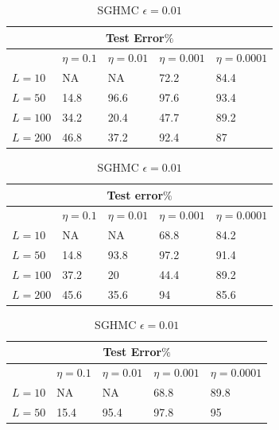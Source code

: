 \documentclass[12pt]{report}
\begin{document}
\begin{table}[]
\begin{minipage}{0.5\linewidth}
\centering
\footnotesize
\begin{tabular}{@{}lllll@{}}
\toprule
\multicolumn{5}{c}{Test Error$\%$}                  \\ \midrule
     & $\eta = 0.1$ & $\eta = 0.01$ & $\eta = 0.001$ & $\eta =0.0001$ \\ \midrule
     
$L=10$  & NA       & NA     & 72.2      & 84.4    \\ \midrule
$L=50 $ & 14.8       & 96.6     & 97.6      & 93.4    \\ \midrule
$L=100$  & 34.2      & 20.4    & 47.7     &  89.2  \\ \midrule
$L =200 $ & 46.8      & 37.2   & 92.4      & 87   \\ \bottomrule
\end{tabular}
\caption{SGHMC $\epsilon = 0.1$}
\end{minipage}
\begin{minipage}{0.5\linewidth}
\centering
\footnotesize
\begin{tabular}{@{}lllll@{}}
\toprule
\multicolumn{5}{c}{Test error$\%$}                  \\ \midrule
     & $\eta = 0.1$ & $\eta = 0.01$ & $\eta = 0.001$ & $\eta =0.0001$ \\ \midrule
$L=10$  & NA       & NA     & 68.8     & 84.2    \\ \midrule
$L=50$  & 14.8      & 93.8    & 97.2     & 91.4  \\ \midrule
$L =100$ & 37.2      & 20   & 44.4      & 89.2   \\ \midrule
$L=200 $ & 45.6      & 35.6     & 94      & 85.6   \\ \bottomrule
\end{tabular}
\caption{SGHMC $\epsilon = 0.01$}
\end{minipage}
\begin{minipage}{0.5\linewidth}
\centering
\footnotesize
\begin{tabular}{@{}lllll@{}}
\toprule
\multicolumn{5}{c}{Test Error$\%$}                  \\ \midrule
     & $\eta = 0.1$ & $\eta = 0.01 $& $\eta = 0.001$ & $\eta =0.0001$ \\ \midrule
$L=10$  & NA       & NA     & 68.8      & 89.8    \\ \midrule
$L=50$  & 15.4      & 95.4    & 97.8     & 95  \\ \midrule

\end{tabular}
\end{minipage}
\end{table}
\end{document}
